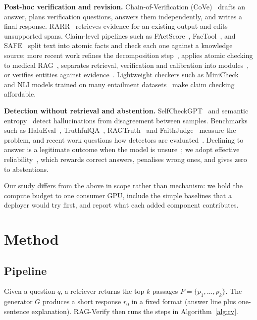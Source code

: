 \documentclass[conference]{IEEEtran}
\begin{document}
\textbf{Post-hoc verification and revision.} Chain-of-Verification (CoVe)~\cite{dhuliawala2023cove} drafts an answer, plans verification questions, answers them independently, and writes a final response. RARR~\cite{gao2022rarr} retrieves evidence for an existing output and edits unsupported spans. Claim-level pipelines such as FActScore~\cite{min2023factscore}, FacTool~\cite{chern2023factool}, and SAFE~\cite{wei2024safe} split text into atomic facts and check each one against a knowledge source; more recent work refines the decomposition step~\cite{afev2025}, applies atomic checking to medical RAG~\cite{vladika2025medical}, separates retrieval, verification and calibration into modules~\cite{r2vc2026}, or verifies entities against evidence~\cite{jia2026entity}. Lightweight checkers such as MiniCheck~\cite{tang2024minicheck} and NLI models trained on many entailment datasets~\cite{laurer2023nli,he2021debertav3} make claim checking affordable.

\textbf{Detection without retrieval and abstention.} SelfCheckGPT~\cite{manakul2023selfcheckgpt} and semantic entropy~\cite{farquhar2024semantic} detect hallucinations from disagreement between samples. Benchmarks such as HaluEval~\cite{li2023halueval}, TruthfulQA~\cite{lin2021truthfulqa}, RAGTruth~\cite{niu2023ragtruth} and FaithJudge~\cite{tamber2025faithjudge} measure the problem, and recent work questions how detectors are evaluated~\cite{chen2026rethinking}. Declining to answer is a legitimate outcome when the model is unsure~\cite{wen2024abstention}; we adopt effective reliability~\cite{whitehead2022reliable}, which rewards correct answers, penalises wrong ones, and gives zero to abstentions.

Our study differs from the above in scope rather than mechanism: we hold the compute budget to one consumer GPU, include the simple baselines that a deployer would try first, and report what each added component contributes.

\section{Method}
\subsection{Pipeline}
Given a question $q$, a retriever returns the top-$k$ passages $P=\{p_1,\dots,p_k\}$. The generator $G$ produces a short response $r_0$ in a fixed format (answer line plus one-sentence explanation). RAG-Verify then runs the steps in Algorithm~\ref{alg:rv}.
\end{document}
